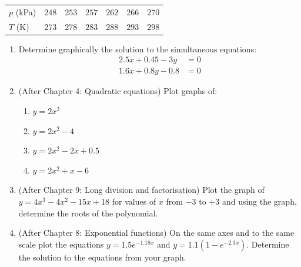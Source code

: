 \documentclass[
  english,
  12pt,
  oneside]{book}
\newcounter{none} %
\providecommand{\tightlist}{%
  \setlength{\itemsep}{0pt}\setlength{\parskip}{0pt}}
\theoremstyle{definition}
\theoremstyle{definition}
\theoremstyle{definition}
\theoremstyle{definition}
\theoremstyle{remark}
\begin{document}
{\def\LTcaptype{none} %
\begin{longtable}[]{@{}
  >{\raggedright\arraybackslash}p{}
  >{\raggedright\arraybackslash}p{}
  >{\raggedright\arraybackslash}p{}
  >{\raggedright\arraybackslash}p{}
  >{\raggedright\arraybackslash}p{}
  >{\raggedright\arraybackslash}p{}
  >{\raggedright\arraybackslash}p{}@{}}
\toprule\noalign{}
\endhead
\bottomrule\noalign{}
\endlastfoot
\(p\) (kPa) & \(248\) & \(253\) & \(257\) & \(262\) & \(266\) & \(270\) \\
\(T\) (K) & \(273\) & \(278\) & \(283\) & \(288\) & \(293\) & \(298\) \\
\end{longtable}
}

\begin{enumerate}
\def\labelenumi{\arabic{enumi}.}
\setcounter{enumi}{3}
\item
  Determine graphically the solution to the simultaneous equations:
  \begin{align*}
  2.5x + 0.45 - 3y &= 0\\
  1.6x + 0.8y - 0.8 &= 0
  \end{align*}
\item
  (After Chapter 4: Quadratic equations) Plot graphs of:

  \begin{enumerate}
  \def\labelenumii{\roman{enumii})}
  \tightlist
  \item
    \(y = 2x^2\)
  \item
    \(y = 2x^2 - 4\)
  \item
    \(y = 2x^2 - 2x + 0.5\)
  \item
    \(y = 2x^2 + x - 6\)
  \end{enumerate}
\item
  (After Chapter 9: Long division and factorisation) Plot the graph of \(y = 4x^3 - 4x^2 - 15x + 18\) for values of \(x\) from \(-3\) to \(+3\) and using the graph, determine the roots of the polynomial.
\item
  (After Chapter 8: Exponential functions) On the same axes and to the same scale plot the equations \(y = 1.5e^{-1.18x}\) and \(y = 1.1(1 - e^{-2.3x})\). Determine the solution to the equations from your graph.
\end{enumerate}
\end{document}
